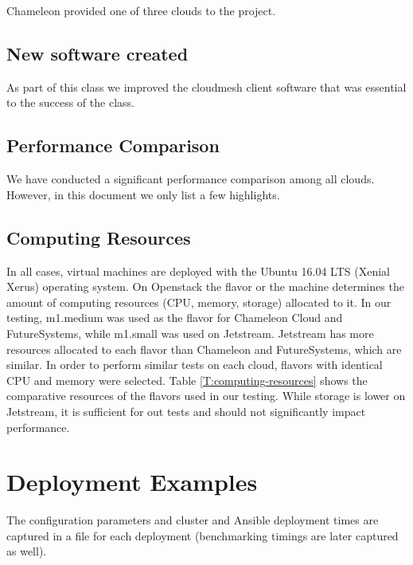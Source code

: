 \documentclass[sigconf]{acmart}
\begin{document}
Chameleon provided one of three clouds to the project.


\subsection{New software created}

As part of this class we improved the cloudmesh client software
\cite{www-cloudmesh-client}\cite{www-cloudmesh-cmd5}
\cite{www-cloudmesh-rest} that was essential to the success of the
class.

\subsection{Performance Comparison}

We have conducted a significant performance comparison among all
clouds. However, in this document we only list a few highlights.

\subsection{Computing Resources}

In all cases, virtual machines are deployed with the Ubuntu 16.04 LTS
(Xenial Xerus) operating system.  On Openstack the flavor or the
machine determines the amount of computing resources (CPU, memory,
storage) allocated to it.  In our testing, m1.medium was used as the
flavor for Chameleon Cloud and FutureSystems, while  m1.small was used
on Jetstream.  Jetstream has more resources allocated to each flavor
than Chameleon and FutureSystems, which are similar.  In order to
perform similar tests on each cloud, flavors with identical CPU and
memory were selected. Table \ref{T:computing-resources} shows the
comparative resources of the flavors used in our testing.  While
storage is lower on Jetstream, it is sufficient for out tests and
should not significantly impact performance. 

\section{Deployment Examples}

The configuration parameters and cluster and Ansible deployment times
are captured in a file for each deployment (benchmarking timings are
later captured as well).  

\end{document}
